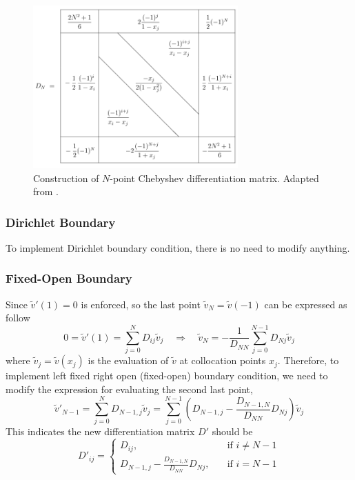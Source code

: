 \begin{figure} [htbp]
	\centering
	\includegraphics[width=0.7\textwidth]{figures/chebyshev-differentiation-matrix.png}
	\caption{Construction of $N$-point Chebyshev differentiation matrix. Adapted from \cite{trefethen_spectral_2000}.}
	\label{fig:chebyshev-differentiation-matrix}
\end{figure}

\subsubsection*{Dirichlet Boundary}
To implement Dirichlet boundary condition, there is no need to modify anything.

\subsubsection*{Fixed-Open Boundary}
Since $\tilde{v}'(1) = 0$ is enforced, so the last point $\tilde{v}_N = \tilde{v}(-1)$ can be expressed as follow
\begin{equation}
	0 = \tilde{v}'(1) = \sum_{j=0}^{N}D_{ij}\tilde{v}_j \quad\Rightarrow\quad \tilde{v}_N = -\frac{1}{D_{NN}}\sum_{j=0}^{N-1} D_{Nj}\tilde{v}_j
\end{equation}
where $\tilde{v}_j=\tilde{v}(x_j)$ is the evaluation of $\tilde{v}$ at collocation points $x_j$. Therefore, to implement left fixed right open (fixed-open) boundary condition, we need to modify the expression for evaluating the second last point,
\begin{equation}
	\tilde{v}'_{N-1} = \sum_{j=0}^{N}D_{N-1,j}\tilde{v}_j = \sum_{j=0}^{N-1}\left(D_{N-1,j} - \frac{D_{N-1,N}}{D_{NN}}D_{Nj}\right)\tilde{v}_j
\end{equation}
This indicates the new differentiation matrix $D'$ should be
\begin{equation}
	D'_{ij} = \begin{cases}
		D_{ij}, \quad                                     & \text{if $i\neq N-1$} \\
		D_{N-1,j} - \frac{D_{N-1,N}}{D_{NN}}D_{Nj}, \quad & \text{if $i=N-1$}
	\end{cases}
\end{equation}

